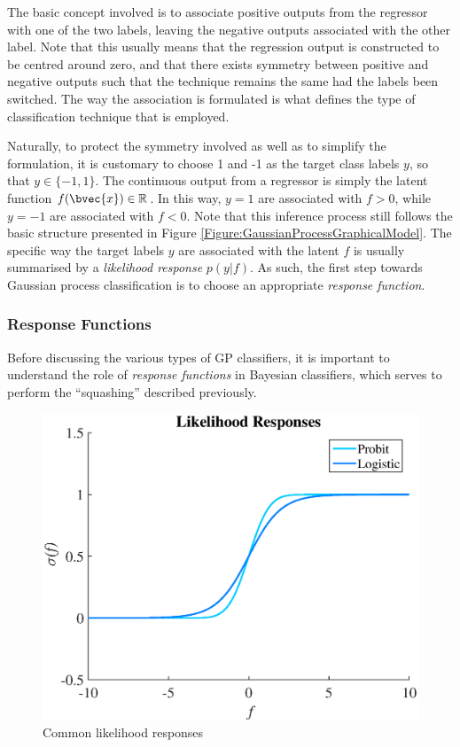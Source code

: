 			The basic concept involved is to associate positive outputs from the regressor with one of the two labels, leaving the negative outputs associated with the other label. Note that this usually means that the regression output is constructed to be centred around zero, and that there exists symmetry between positive and negative outputs such that the technique remains the same had the labels been switched. The way the association is formulated is what defines the type of classification technique that is employed.
			
			Naturally, to protect the symmetry involved as well as to simplify the formulation, it is customary to choose 1 and -1 as the target class labels $y$, so that $y \in \{-1, 1\}$. The continuous output from a regressor is simply the latent function $f(\bvec{x}) \in \mathbb{R}$. In this way, $y = 1$ are associated with $f > 0$, while $y = -1$ are associated with $f < 0$. Note that this inference process still follows the basic structure presented in Figure \ref{Figure:GaussianProcessGraphicalModel}. The specific way the target labels $y$ are associated with the latent $f$ is usually summarised by a \textit{likelihood response} $p(y | f)$. As such, the first step towards Gaussian process classification is to choose an appropriate \textit{response function}.
			
			\subsubsection{Response Functions}
			\label{BenthicHabitatMapping:Classification:ResponseFunction}
			
				Before discussing the various types of GP classifiers, it is important to understand the role of \textit{response functions} in Bayesian classifiers, which serves to perform the ``squashing'' described previously.
	
				\begin{figure}
					\centering
						\includegraphics[width=\linewidth]{Figures/responses.eps}
					\caption{Common likelihood responses}
					\label{Figure:LikelihoodResponses}
				\end{figure}
						
